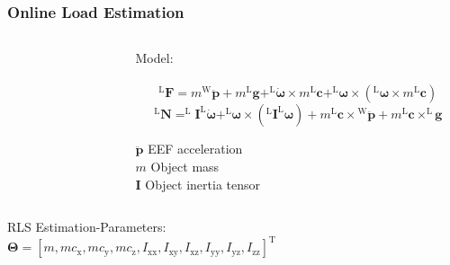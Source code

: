 \documentclass[student,noshadow]{ITRslides}
\renewcommand{\vec}[1]{\boldsymbol{#1}}
\renewcommand{\vec}[1]{\boldsymbol{#1}}
\newcommand{\scr}[1]{\mathrm{#1}}
\begin{document}
\begin{frame}
	\frametitle{Online Load Estimation}

	\begin{columns}
		\centering
		 	\begin{column}{0.25\textwidth}
			\begin{figure}
			\centering
				
			\end{figure}
		 	\end{column}
		 		
		 	\begin{column}{0.75\textwidth}
			Model:\\ \cite{literaturstelle2}\\
			\[^\scr{L}\vec{F} = m {^\scr{W}}\vec{\ddot{p}} + m ^\scr{L}\vec{g} + ^\scr{L}\vec{\dot{\omega}} \times m ^\scr{L}\vec{c} + ^\scr{L}\vec{\omega} \times (^\scr{L}\vec{\omega} \times m ^\scr{L}\vec{c})\]
			\[^\scr{L}\vec{N} = ^\scr{L}\vec{I} ^\scr{L}\vec{\dot{\omega}} + ^\scr{L}\vec{\omega} \times (^\scr{L}\vec{I} ^\scr{L}\vec{\omega}) + m ^\scr{L}\vec{c} \times {^\scr{W}}\vec{\ddot{p}} + m ^\scr{L}\vec{c} \times ^\scr{L}\vec{g}\]
			
			\vspace{0.1cm}
			$\vec{\ddot{p}}$ EEF acceleration\\
			$m$ Object mass\\
			$\vec{I}$  Object inertia tensor
		 	\end{column}
	\end{columns}
	 		\vspace{0.2cm}
			RLS Estimation-Parameters: \\
			$\vec{\Theta} = [m, m c_\scr{x}, m c_\scr{y}, m c_\scr{z}, I_\scr{xx}, I_\scr{xy}, I_\scr{xz}, I_\scr{yy},I_\scr{yz}, I_\scr{zz}]^\scr{T}$ \\
\end{frame}
\end{document}
